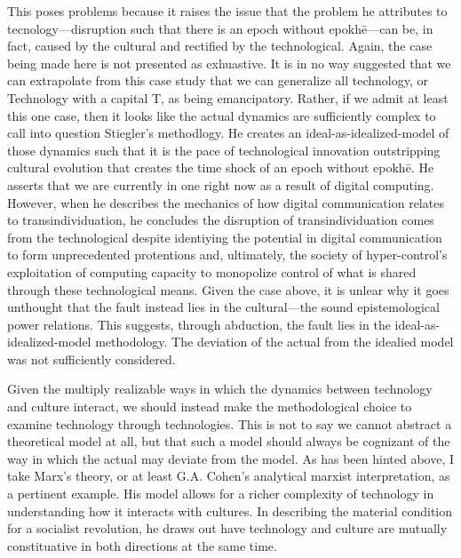 \documentclass[letterpaper,notitlepage,12pt]{article}
\begin{document}
This poses problems because it raises the issue that the problem he attributes
to tecnology---disruption such that there is an epoch without epokh\={e}---can
be, in fact, caused by the cultural and rectified by the technological.
Again, the case being made here is not presented as exhuastive.
It is in no way suggested that we can extrapolate from this case study that we
can generalize all technology, or Technology with a capital T, as being
emancipatory.
Rather, if we admit at least this one case, then it looks like the actual
dynamics are sufficiently complex to call into question Stiegler's methodlogy.
He creates an ideal-as-idealized-model of those dynamics such that it is the
pace of technological innovation outstripping cultural evolution that creates
the time shock of an epoch without epokh\={e}.
He asserts that we are currently in one right now as a result of digital
computing.
However, when he describes the mechanics of how digital communication relates to
transindividuation, he concludes the disruption of transindividuation comes from
the technological despite identiying the potential in digital communication to
form unprecedented protentions and, ultimately, the society of hyper-control's
exploitation of computing capacity to monopolize control of what is shared
through these technological means.
Given the case above, it is unlear why it goes unthought that the fault instead
lies in the cultural---the sound epistemological power relations.
This suggests, through abduction, the fault lies in the ideal-as-idealized-model
methodology.
The deviation of the actual from the idealied model was not sufficiently
considered.

Given the multiply realizable ways in which the dynamics between technology and
culture interact, we should instead make the methodological choice to examine
technology through technologies.
This is not to say we cannot abstract a theoretical model at all, but that such
a model should always be cognizant of the way in which the actual may deviate
from the model.
As has been hinted above, I take Marx's theory, or at least G.A. Cohen's
analytical marxist interpretation, as a pertinent example.
His model allows for a richer complexity of technology in understanding how it
interacts with cultures.
In describing the material condition for a socialist revolution, he draws out
have technology and culture are mutually constituative in both directions at the
same time.
\end{document}
